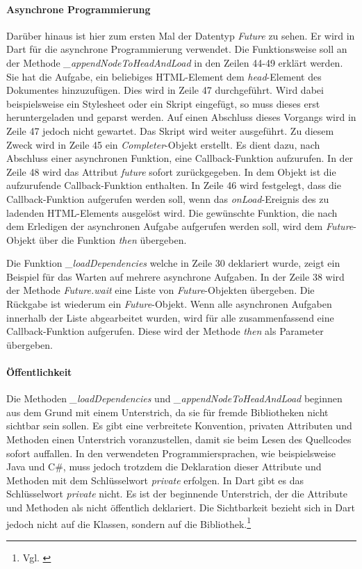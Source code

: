 \paragraph{Asynchrone Programmierung}
Darüber hinaus ist hier zum ersten Mal der Daten\-typ \textit{Future} zu sehen. Er wird in Dart für die asynchrone Programmierung verwendet. Die Funktionsweise soll an der Methode \textit{\_appendNodeToHeadAndLoad} in den Zeilen 44-49 erklärt werden. Sie hat die Aufgabe, ein beliebiges HTML-Element dem \textit{head}-Element des Dokumentes hinzuzufügen. Dies wird in Zeile 47 durchgeführt. Wird dabei beispielsweise ein Stylesheet oder ein Skript eingefügt, so muss dieses erst heruntergeladen und geparst werden. Auf einen Abschluss dieses Vorgangs wird in Zeile 47 jedoch nicht gewartet. Das Skript wird weiter ausgeführt. Zu diesem Zweck wird in Zeile 45 ein \textit{Completer}-Objekt erstellt. Es dient dazu, nach Abschluss einer asynchronen Funktion, eine Callback-Funktion aufzurufen. In der Zeile 48 wird das Attribut \textit{future} sofort zurückgegeben. In dem Objekt ist die aufzurufende Callback-Funktion enthalten. In Zeile 46 wird festgelegt, dass die Callback-Funktion aufgerufen werden soll, wenn das \textit{onLoad}-Ereignis des zu ladenden HTML-Elements ausgelöst wird.
Die gewünschte Funktion, die nach dem Erledigen der asynchronen Aufgabe aufgerufen werden soll, wird dem \textit{Future}-Objekt über die Funktion \textit{then} übergeben.

Die Funktion \textit{\_loadDependencies} welche in Zeile 30 deklariert wurde, zeigt ein Beispiel für das Warten auf mehrere asynchrone Aufgaben. In der Zeile 38 wird der Methode \textit{Future.wait} eine Liste von \textit{Future}-Objekten übergeben. Die Rückgabe ist wiederum ein \textit{Future}-Objekt. Wenn alle asynchronen Aufgaben innerhalb der Liste abgearbeitet wurden, wird für alle zusammenfassend eine Callback-Funktion aufgerufen. Diese wird der Methode \textit{then} als Parameter übergeben.


\paragraph{Öffentlichkeit}
Die Methoden \textit{\_loadDependencies} und \textit{\_appendNodeToHeadAndLoad} beginnen aus dem Grund mit einem Unterstrich, da sie für fremde Bibliotheken nicht sichtbar sein sollen. Es gibt eine verbreitete Konvention, privaten Attributen und Methoden einen Unterstrich voranzustellen, damit sie beim Lesen des Quellcodes sofort auffallen. In den verwendeten Programmiersprachen, wie beispielsweise Java und C\#, muss jedoch trotzdem die Deklaration dieser Attribute und Methoden mit dem Schlüssel\-wort \textit{private} erfolgen. In Dart gibt es das Schlüssel\-wort \textit{private} nicht. Es ist der beginnende Unterstrich, der die Attribute und Methoden als nicht öffentlich deklariert. Die Sichtbar\-keit bezieht sich in Dart jedoch nicht auf die Klassen, sondern auf die Bibliothek.\footnote{Vgl. \cite[S. 10]{EcmaDartProgrammingLanguageSpecificationSecondEdition}}

